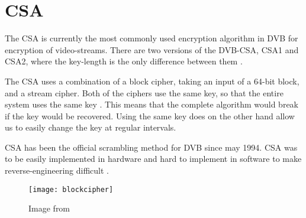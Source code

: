 \chapter{CSA} \label{ch:CSA}
The CSA is currently the most commonly used encryption algorithm in DVB for 
encryption of video-streams. There are two versions of the DVB-CSA, CSA1 and 
CSA2, where the key-length is the only difference between them 
\citep[p. 23]{DVBScene:2013}. 

The CSA uses a combination of a block cipher, taking an input of a 64-bit block, 
and a stream cipher. Both of the ciphers use the same key, so that the entire 
system uses the same key \citep[pp. 271--272]{WeiLi:2007}. This means that the 
complete algorithm would break if the key would be recovered. Using the same key 
does on the other hand allow us to easily change the key at regular intervals. 

CSA has been the official scrambling method for DVB since may 1994. CSA was 
to be easily implemented in hardware and hard to implement in software to make 
reverse-engineering difficult \citep{DVBScene:2013}.




\begin{figure}
  \begin{center}
    \texttt{[image: blockcipher]}
  \end{center}
  \caption{Image from \citet[pp. 49]{Breaking:2012}}
  \label{fig:blockcipher}
\end{figure}

